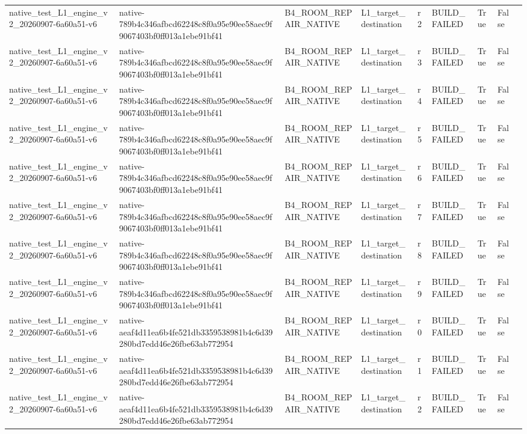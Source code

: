 \begin{tabular}{lllllllll}
native\_test\_L1\_engine\_v2\_20260907-6a60a51-v6 & native-789b4c346afbcd62248c8f0a95e90ee58aec9f9067403bf0ff013a1ebe91bf41 & B4\_ROOM\_REPAIR\_NATIVE & L1\_target\_destination & r2 & BUILD\_FAILED & True & False &  \\
native\_test\_L1\_engine\_v2\_20260907-6a60a51-v6 & native-789b4c346afbcd62248c8f0a95e90ee58aec9f9067403bf0ff013a1ebe91bf41 & B4\_ROOM\_REPAIR\_NATIVE & L1\_target\_destination & r3 & BUILD\_FAILED & True & False &  \\
native\_test\_L1\_engine\_v2\_20260907-6a60a51-v6 & native-789b4c346afbcd62248c8f0a95e90ee58aec9f9067403bf0ff013a1ebe91bf41 & B4\_ROOM\_REPAIR\_NATIVE & L1\_target\_destination & r4 & BUILD\_FAILED & True & False &  \\
native\_test\_L1\_engine\_v2\_20260907-6a60a51-v6 & native-789b4c346afbcd62248c8f0a95e90ee58aec9f9067403bf0ff013a1ebe91bf41 & B4\_ROOM\_REPAIR\_NATIVE & L1\_target\_destination & r5 & BUILD\_FAILED & True & False &  \\
native\_test\_L1\_engine\_v2\_20260907-6a60a51-v6 & native-789b4c346afbcd62248c8f0a95e90ee58aec9f9067403bf0ff013a1ebe91bf41 & B4\_ROOM\_REPAIR\_NATIVE & L1\_target\_destination & r6 & BUILD\_FAILED & True & False &  \\
native\_test\_L1\_engine\_v2\_20260907-6a60a51-v6 & native-789b4c346afbcd62248c8f0a95e90ee58aec9f9067403bf0ff013a1ebe91bf41 & B4\_ROOM\_REPAIR\_NATIVE & L1\_target\_destination & r7 & BUILD\_FAILED & True & False &  \\
native\_test\_L1\_engine\_v2\_20260907-6a60a51-v6 & native-789b4c346afbcd62248c8f0a95e90ee58aec9f9067403bf0ff013a1ebe91bf41 & B4\_ROOM\_REPAIR\_NATIVE & L1\_target\_destination & r8 & BUILD\_FAILED & True & False &  \\
native\_test\_L1\_engine\_v2\_20260907-6a60a51-v6 & native-789b4c346afbcd62248c8f0a95e90ee58aec9f9067403bf0ff013a1ebe91bf41 & B4\_ROOM\_REPAIR\_NATIVE & L1\_target\_destination & r9 & BUILD\_FAILED & True & False &  \\
native\_test\_L1\_engine\_v2\_20260907-6a60a51-v6 & native-aeaf4d11ea6b4fe521db3359538981b4c6d39280bd7edd46e26fbe63ab772954 & B4\_ROOM\_REPAIR\_NATIVE & L1\_target\_destination & r0 & BUILD\_FAILED & True & False &  \\
native\_test\_L1\_engine\_v2\_20260907-6a60a51-v6 & native-aeaf4d11ea6b4fe521db3359538981b4c6d39280bd7edd46e26fbe63ab772954 & B4\_ROOM\_REPAIR\_NATIVE & L1\_target\_destination & r1 & BUILD\_FAILED & True & False &  \\
native\_test\_L1\_engine\_v2\_20260907-6a60a51-v6 & native-aeaf4d11ea6b4fe521db3359538981b4c6d39280bd7edd46e26fbe63ab772954 & B4\_ROOM\_REPAIR\_NATIVE & L1\_target\_destination & r2 & BUILD\_FAILED & True & False &  \\

\end{tabular}
